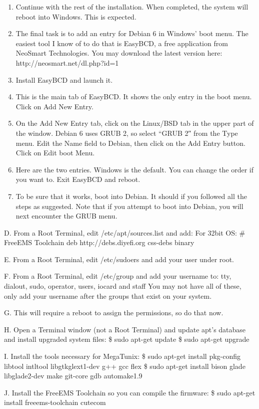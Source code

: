 \documentclass[12pt,notitlepage,onecolumn,oneside,draft]{memoir}
\begin{document}
\begin{enumerate}
\item Continue with the rest of the installation. When completed, the system will reboot into Windows. This is expected. 
\item The final task is to add an entry for Debian 6 in Windows’ boot menu. The easiest tool I know of to do that is EasyBCD, a free application from NeoSmart Technologies. You may download the latest version here: http://neosmart.net/dl.php?id=1 
\item Install EasyBCD and launch it. 
\item This is the main tab of EasyBCD. It shows the only entry in the boot menu. Click on Add New Entry. 
\item On the Add New Entry tab, click on the Linux/BSD tab in the upper part of the window. Debian 6 uses GRUB 2, so select “GRUB 2″ from the Type menu. Edit the Name field to Debian, then click on the Add Entry button. Click on Edit boot Menu. 
\item Here are the two entries. Windows is the default. You can change the order if you want to. Exit EasyBCD and reboot. 
\item To be sure that it works, boot into Debian. It should if you followed all the steps as suggested. Note that if you attempt to boot into Debian, you will next encounter the GRUB menu.
\end{enumerate}

D. From a Root Terminal, edit /etc/apt/sources.list and add:
	For 32bit OS:
# FreeEMS Toolchain
deb http://debs.diyefi.org css-debs binary

E. From a Root Terminal, edit /etc/sudoers and add your user under root.

F. From a Root Terminal, edit /etc/group and add your username to:
tty, dialout, sudo, operator, users, iocard and staff
You may not have all of these, only add your username after the groups that exist on your system.

G. This will require a reboot to assign the permissions, so do that now.

H. Open a Terminal window (not a Root Terminal) and update apt's database and install upgraded system files:
\$ sudo apt-get update
\$ sudo apt-get upgrade

I. Install the tools necessary for MegaTunix:
\$ sudo apt-get install pkg-config libtool intltool libgtkglext1-dev g++ gcc flex 
\$ sudo apt-get install bison glade libglade2-dev make git-core gdb automake1.9

J. Install the FreeEMS Toolchain so you can compile the firmware:
	\$ sudo apt-get install freeems-toolchain cutecom
\end{document}
